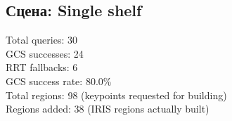 \documentclass[a4paper]{article}
\begin{document}

\medskip

\subsection*{Сцена: Single shelf}


  Total queries:      30 \\
  GCS successes:      24 \\
  RRT fallbacks:      6 \\
  GCS success rate:   80.0\% \\
  Total regions:      98 (keypoints requested for building) \\
  Regions added:      38 (IRIS regions actually built) \\
\end{document}
